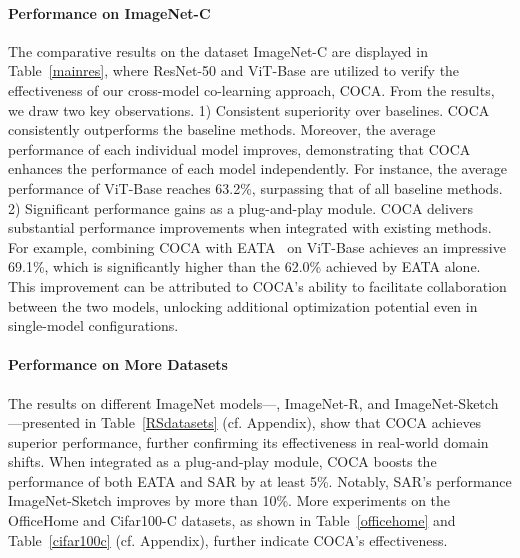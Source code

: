 \vspace{-10pt}
\paragraph{Performance on ImageNet-C}
The comparative results on the dataset ImageNet-C are displayed in Table~\ref{mainres}, where ResNet-50 and ViT-Base are utilized to verify the effectiveness of our cross-model co-learning approach, COCA. From the results, we draw two key observations. 1) Consistent superiority over baselines. COCA consistently outperforms the baseline methods. Moreover, the average performance of each individual model improves, demonstrating that COCA enhances the performance of each model independently. For instance, the average performance of ViT-Base reaches 63.2\%, surpassing that of all baseline methods. 2) Significant performance gains as a plug-and-play module. COCA delivers substantial performance improvements when integrated with existing methods. For example, combining COCA with EATA~\cite{niu2022efficient} on ViT-Base achieves an impressive 69.1\%, which is significantly higher than the 62.0\% achieved by EATA alone. This improvement can be attributed to COCA’s ability to facilitate collaboration between the two models, unlocking additional optimization potential even in single-model configurations.

\vspace{-10pt}
\paragraph{Performance on More Datasets}
The results on different ImageNet models—, ImageNet-R, and ImageNet-Sketch—presented in Table~\ref{RSdatasets} (cf. Appendix), show that COCA achieves superior performance, further confirming its effectiveness in real-world domain shifts. When integrated as a plug-and-play module, COCA boosts the performance of both EATA and SAR by at least 5\%. Notably, SAR's performance ImageNet-Sketch improves by more than 10\%. More experiments on the OfficeHome and Cifar100-C datasets, as shown in Table~\ref{officehome} and Table~\ref{cifar100c} (cf. Appendix), further indicate COCA's effectiveness.




